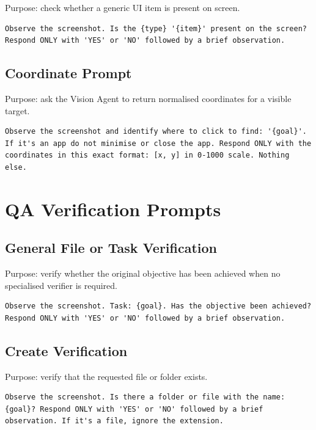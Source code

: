 Purpose: check whether a generic UI item is present on screen.

\begin{lstlisting}
Observe the screenshot. Is the {type} '{item}' present on the screen? Respond ONLY with 'YES' or 'NO' followed by a brief observation.
\end{lstlisting}

\subsection{Coordinate Prompt}

Purpose: ask the Vision Agent to return normalised coordinates for a visible target.

\begin{lstlisting}
Observe the screenshot and identify where to click to find: '{goal}'. If it's an app do not minimise or close the app. Respond ONLY with the coordinates in this exact format: [x, y] in 0-1000 scale. Nothing else.
\end{lstlisting}

\section{QA Verification Prompts}

\subsection{General File or Task Verification}

Purpose: verify whether the original objective has been achieved when no specialised verifier is required.

\begin{lstlisting}
Observe the screenshot. Task: {goal}. Has the objective been achieved? Respond ONLY with 'YES' or 'NO' followed by a brief observation.
\end{lstlisting}

\subsection{Create Verification}

Purpose: verify that the requested file or folder exists.

\begin{lstlisting}
Observe the screenshot. Is there a folder or file with the name: {goal}? Respond ONLY with 'YES' or 'NO' followed by a brief observation. If it's a file, ignore the extension.
\end{lstlisting}

